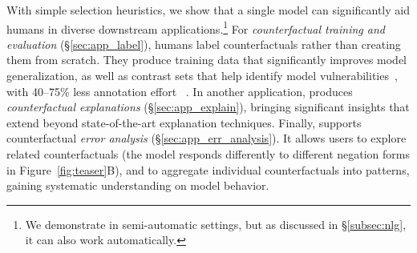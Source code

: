 
With simple selection heuristics, we show that a single \sysname model can significantly aid humans in diverse downstream applications.\footnote{We demonstrate \sysname in semi-automatic settings, but as discussed in \S\ref{subsec:nlg}, it can also work automatically.} 
For \emph{counterfactual training and evaluation} (\S\ref{sec:app_label}), humans label \sysname counterfactuals rather than creating them from scratch.
They produce training data that significantly improves model generalization, as well as contrast sets that help identify model vulnerabilities~\cite{gardner2020contrast}, with 40--75\% less annotation effort ~\cite{kaushik2019learning}. 
In another application, \sysname produces \emph{counterfactual explanations} (\S\ref{sec:app_explain}), bringing significant insights that extend beyond state-of-the-art explanation techniques. 
Finally, \sysname supports counterfactual \emph{error analysis} (\S\ref{sec:app_err_analysis}).
It allows users to explore related counterfactuals (\eg the model responds differently to different negation forms in Figure~\ref{fig:teaser}B), and to aggregate individual counterfactuals into patterns, gaining systematic understanding on model behavior.




